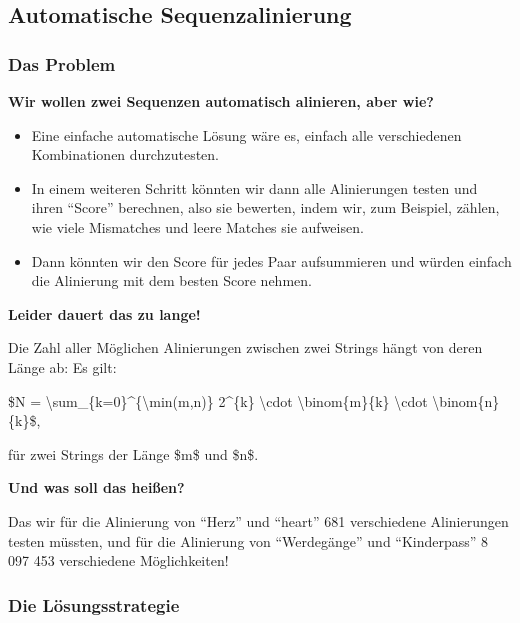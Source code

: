 
\subsection{Automatische Sequenzalinierung}

\subsubsection{\texorpdfstring{{Das Problem}}{Das Problem}}

\par\noindent\textbf{Wir wollen zwei Sequenzen automatisch alinieren, aber wie?}

\begin{itemize}
\itemsep1pt\parskip0pt
\item
  {Eine einfache automatische Lösung wäre es, einfach alle verschiedenen
  Kombinationen durchzutesten.}
\item
  {In einem weiteren Schritt könnten wir dann alle Alinierungen testen
  und ihren ``Score'' berechnen, also sie bewerten, indem wir, zum
  Beispiel, zählen, wie viele Mismatches und leere Matches sie
  aufweisen.}
\item
  {Dann könnten wir den Score für jedes Paar aufsummieren und würden
  einfach die Alinierung mit dem besten Score nehmen.}
\end{itemize}




\par\noindent\textbf{Leider dauert das zu lange!}

Die Zahl aller Möglichen Alinierungen zwischen zwei Strings hängt von
deren Länge ab: Es gilt:

\$N = \textbackslash{}sum\_\{k=0\}\^{}\{\textbackslash{}min(m,n)\}
2\^{}\{k\} \textbackslash{}cdot \textbackslash{}binom\{m\}\{k\}
\textbackslash{}cdot \textbackslash{}binom\{n\}\{k\}\$,

für zwei Strings der Länge \$m\$ und \$n\$.




\par\noindent\textbf{Und was soll das heißen?}

Das wir für die Alinierung von ``Herz'' und ``heart'' 681 verschiedene
Alinierungen testen müssten, und für die Alinierung von ``Werdegänge''
und ``Kinderpass'' 8 097 453 verschiedene Möglichkeiten!



\subsubsection{\texorpdfstring{{Die
Lösungsstrategie}}{Die Lösungsstrategie}}

